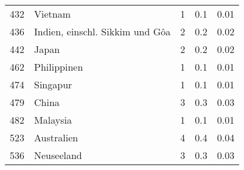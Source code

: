 \begin{longtable}{lXrrr}
        432 & \multicolumn{1}{X}{Vietnam} & %
          \num{1} &
          \num[round-mode=places,round-precision=2]{0.1} &
          \num[round-mode=places,round-precision=2]{0.01} \\

        436 & \multicolumn{1}{X}{Indien, einschl. Sikkim und Gôa} & %
          \num{2} &
          \num[round-mode=places,round-precision=2]{0.2} &
          \num[round-mode=places,round-precision=2]{0.02} \\

        442 & \multicolumn{1}{X}{Japan} & %
          \num{2} &
          \num[round-mode=places,round-precision=2]{0.2} &
          \num[round-mode=places,round-precision=2]{0.02} \\

        462 & \multicolumn{1}{X}{Philippinen} & %
          \num{1} &
          \num[round-mode=places,round-precision=2]{0.1} &
          \num[round-mode=places,round-precision=2]{0.01} \\

        474 & \multicolumn{1}{X}{Singapur} & %
          \num{1} &
          \num[round-mode=places,round-precision=2]{0.1} &
          \num[round-mode=places,round-precision=2]{0.01} \\

        479 & \multicolumn{1}{X}{China} & %
          \num{3} &
          \num[round-mode=places,round-precision=2]{0.3} &
          \num[round-mode=places,round-precision=2]{0.03} \\

        482 & \multicolumn{1}{X}{Malaysia} & %
          \num{1} &
          \num[round-mode=places,round-precision=2]{0.1} &
          \num[round-mode=places,round-precision=2]{0.01} \\

        523 & \multicolumn{1}{X}{Australien} & %
          \num{4} &
          \num[round-mode=places,round-precision=2]{0.4} &
          \num[round-mode=places,round-precision=2]{0.04} \\

        536 & \multicolumn{1}{X}{Neuseeland} & %
          \num{3} &
          \num[round-mode=places,round-precision=2]{0.3} &
          \num[round-mode=places,round-precision=2]{0.03} \\


\end{longtable}
